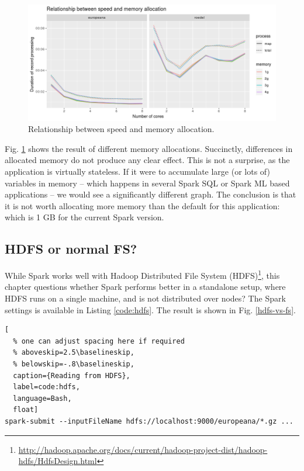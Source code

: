 \begin{figure}
\includegraphics[width=\textwidth]{images/chapter06/memory-allocation-details.png}
\caption{Relationship between speed and memory allocation.}
\label{memory-allocation-details}
\end{figure}

Fig. \ref{memory-allocation-details} shows the result of different memory allocations. Succinctly, differences in allocated memory do not produce any clear effect. This is not a surprise, as the application is virtually stateless. If it were to accumulate large (or lots of) variables in memory -- which happens in several Spark SQL or Spark ML based applications -- we would see a significantly different graph. The conclusion is that it is not worth allocating more memory than the default for this application: which is 1 GB for the current Spark version.

\subsection{HDFS or normal FS?}

While Spark works well with Hadoop Distributed File System (HDFS)\footnote{\url{http://hadoop.apache.org/docs/current/hadoop-project-dist/hadoop-hdfs/HdfsDesign.html}}, this chapter questions whether Spark performs better in a standalone setup, where HDFS runs on a single machine, and is not distributed over nodes? The Spark settings is available in Listing \ref{code:hdfs}. The result is shown in Fig. \ref{hdfs-vs-fs}.

\begin{lstlisting}[
  % one can adjust spacing here if required
  % aboveskip=2.5\baselineskip,
  % belowskip=-.8\baselineskip,
  caption={Reading from HDFS},
  label=code:hdfs,
  language=Bash,
  float]
spark-submit --inputFileName hdfs://localhost:9000/europeana/*.gz ...
\end{lstlisting}


